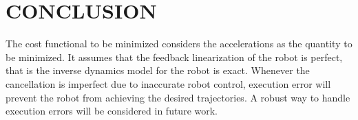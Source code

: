 \section{CONCLUSION}\label{end}

The cost functional to be minimized considers the accelerations as the quantity to be minimized. It assumes that the feedback linearization of the robot is perfect, that is the inverse dynamics model for the robot is exact. Whenever the cancellation is imperfect due to inaccurate robot control, execution error will prevent the robot from achieving the desired trajectories. A robust way to handle execution errors will be considered in future work.